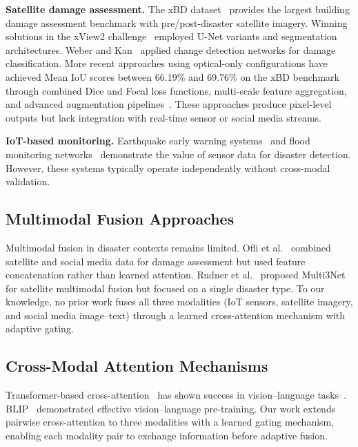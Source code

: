 \documentclass[journal]{IEEEtran}
\begin{document}
\textbf{Satellite damage assessment.} The xBD dataset~\cite{gupta2019xbd} provides the largest building damage assessment benchmark with pre/post-disaster satellite imagery. Winning solutions in the xView2 challenge~\cite{xview2} employed U-Net variants and segmentation architectures. Weber and Kan~\cite{weber2020building} applied change detection networks for damage classification. More recent approaches using optical-only configurations have achieved Mean IoU scores between 66.19\% and 69.76\% on the xBD benchmark through combined Dice and Focal loss functions, multi-scale feature aggregation, and advanced augmentation pipelines~\cite{benson2025xbdsota}. These approaches produce pixel-level outputs but lack integration with real-time sensor or social media streams.

\textbf{IoT-based monitoring.} Earthquake early warning systems~\cite{allen2009real} and flood monitoring networks~\cite{basha2008model} demonstrate the value of sensor data for disaster detection. However, these systems typically operate independently without cross-modal validation.

\subsection{Multimodal Fusion Approaches}

Multimodal fusion in disaster contexts remains limited. Ofli et al.~\cite{ofli2020analysis} combined satellite and social media data for damage assessment but used feature concatenation rather than learned attention. Rudner et al.~\cite{rudner2019multi3net} proposed Multi3Net for satellite multimodal fusion but focused on a single disaster type. To our knowledge, no prior work fuses all three modalities (IoT sensors, satellite imagery, and social media image--text) through a learned cross-attention mechanism with adaptive gating.

\subsection{Cross-Modal Attention Mechanisms}

Transformer-based cross-attention~\cite{vaswani2017attention} has shown success in vision--language tasks~\cite{lu2019vilbert,tan2019lxmert}. BLIP~\cite{li2022blip} demonstrated effective vision--language pre-training. Our work extends pairwise cross-attention to three modalities with a learned gating mechanism, enabling each modality pair to exchange information before adaptive fusion.
\end{document}
